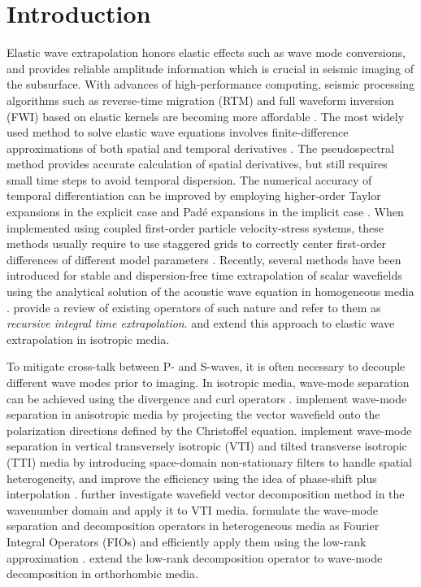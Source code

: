 \section{Introduction}
Elastic wave extrapolation honors elastic effects such as wave mode conversions, and provides reliable amplitude information which is crucial in seismic imaging of the subsurface. With advances of high-performance computing, seismic processing algorithms such as reverse-time migration (RTM) and full waveform inversion (FWI) based on elastic kernels are becoming more affordable \cite[]{lu10,denes14}. The most widely used method to solve elastic wave equations involves finite-difference approximations of both spatial and temporal derivatives \cite[]{virieux84,virieux86,etgen87,levander88,bernth10,bernth11}. The pseudo\-spectral method \cite[]{kosloff84,reshef88,psbook} provides accurate calculation of spatial derivatives, but still requires small time steps to avoid temporal dispersion. The numerical accuracy of temporal differentiation can be improved by employing higher-order Taylor expansions in the explicit case \cite[]{dablain86,crase90} and Pad\'{e} expansions in the implicit case \cite[]{chuthesis,liu09}. When implemented using coupled first-order particle velocity-stress systems, these methods usually require to use staggered grids to correctly center first-order differences of different model parameters \cite[]{ozdenvar96,correa02,bernth10}. Recently, several methods have been introduced for stable and dispersion-free time extrapolation of scalar wavefields using the analytical solution of the acoustic wave equation in homogeneous media \cite[]{tal-ezer86,tal-ezer87,tabei02,etgen09,zhang09,pestana10,chu10,lowrank,song13,fang14,sun16}. \cite{rite} provide a review of existing operators of such nature and refer to them as \emph{recursive integral time extrapolation}. \cite{chu11} and \cite{firouzi12} extend this approach to elastic wave extrapolation in isotropic media.

To mitigate cross-talk between P- and S-waves, it is often necessary to decouple different wave modes prior to imaging. In isotropic media, wave-mode separation can be achieved using the divergence and curl operators \cite[]{aki}. \cite{joejohn} implement wave-mode separation in anisotropic media by projecting the vector wavefield onto the polarization directions defined by the Christoffel equation. \cite{yanvti,yantti} implement wave-mode separation in vertical transversely isotropic (VTI) and tilted transverse isotropic (TTI) media by introducing space-domain non-stationary filters to handle spatial heterogeneity, and improve the efficiency using the idea of phase-shift plus interpolation \cite[]{yanpspi}. \cite{zm} further investigate wavefield vector decomposition method in the wavenumber domain and apply it to VTI media. \cite{chengfomel} formulate the wave-mode separation and decomposition operators in heterogeneous media as Fourier Integral Operators (FIOs) and efficiently apply them using the low-rank approximation \cite[]{lowrank}. \cite{sripanich15} extend the low-rank decomposition operator to wave-mode decomposition in orthorhombic media.

